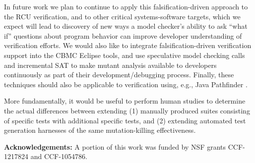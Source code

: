 \documentclass{svjour3}
\begin{document}
In future work we plan to continue to apply this falsification-driven
approach to the RCU verification, and to other critical
systems-software targets, which we expect will lead to discovery of
new ways a model checker's ability to ask ``what if'' questions about
program behavior \cite{GroceDist,MakeMost} can improve developer
understanding of verification efforts.   We would also like to
integrate falsification-driven verification support into the CBMC
Eclipse tools, and use speculative model checking calls and
incremental SAT to make mutant analysis available to developers
continuously as part of their development/debugging process.  Finally,
these techniques should also be applicable to verification using,
e.g., Java Pathfinder \cite{JPF2}.

More fundamentally, it would be useful to perform human studies to
determine the actual differences between extending (1)
manually produced suites consisting of specific tests with additional specific
tests, and (2) extending automated test generation harnesses of the
same mutation-killing effectiveness. 

{\bf Acknowledgements:}
A portion of this work was funded by NSF grants CCF-1217824
and CCF-1054786.



%







%
%
%
% 




\end{document}
